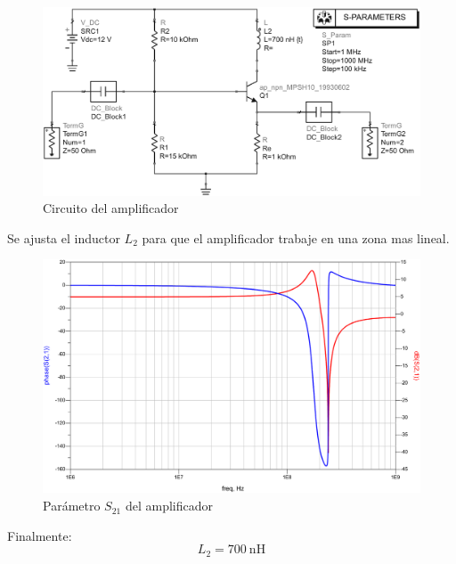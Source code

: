 \documentclass[journal]{IEEEtran}
\begin{document}
\begin{figure}[H]
\centering
\includegraphics[width=1\linewidth]{capturas/clapp_ampli_sch-cropped.pdf}
\caption{Circuito del amplificador}
\label{fig:clapp_amp_sch}
\end{figure}
Se ajusta el inductor $L_2$ para que el amplificador trabaje en una zona mas lineal.
\begin{figure}[H]
\centering
\includegraphics[width=1\linewidth]{capturas/clapp_ampli_bode-cropped.pdf}
\caption{Parámetro $S_{21}$ del amplificador}
\label{fig:clapp_amp_s21}
\end{figure}
Finalmente:
$$
    \boxed{L_2 = \SI{700}{\nano\henry}}
$$
\end{document}
